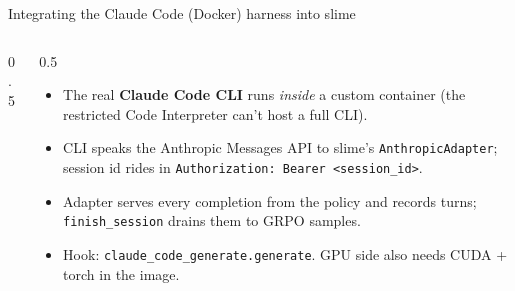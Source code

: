 \documentclass[aspectratio=169]{beamer}
\begin{document}
\begin{frame}{Integrating the Claude Code (Docker) harness into slime}
  \begin{columns}[T]
    \begin{column}{0.5\textwidth}
    \end{column}
    \begin{column}{0.5\textwidth}
      \footnotesize
      \begin{itemize}\setlength\itemsep{0.3em}
        \item The real \textbf{Claude Code CLI} runs \emph{inside} a custom container (the
          restricted Code Interpreter can't host a full CLI).
        \item CLI speaks the Anthropic Messages API to slime's \texttt{AnthropicAdapter};
          session id rides in \texttt{Authorization: Bearer <session\_id>}.
        \item Adapter serves every completion from the policy and records turns; \texttt{finish\_session}
          drains them to GRPO samples.
        \item Hook: \texttt{claude\_code\_generate.generate}. GPU side also needs CUDA + torch in the image.
      \end{itemize}
    \end{column}
  \end{columns}
\end{frame}
\end{document}
